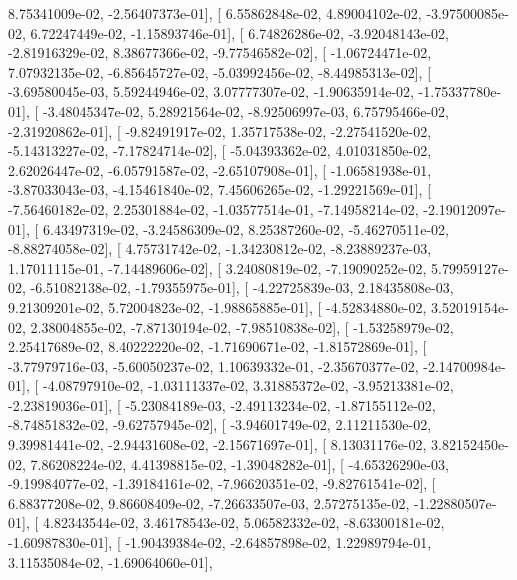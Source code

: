 \documentclass{article}
\begin{document}
          8.75341009e-02,  -2.56407373e-01],
       [  6.55862848e-02,   4.89004102e-02,  -3.97500085e-02,
          6.72247449e-02,  -1.15893746e-01],
       [  6.74826286e-02,  -3.92048143e-02,  -2.81916329e-02,
          8.38677366e-02,  -9.77546582e-02],
       [ -1.06724471e-02,   7.07932135e-02,  -6.85645727e-02,
         -5.03992456e-02,  -8.44985313e-02],
       [ -3.69580045e-03,   5.59244946e-02,   3.07777307e-02,
         -1.90635914e-02,  -1.75337780e-01],
       [ -3.48045347e-02,   5.28921564e-02,  -8.92506997e-03,
          6.75795466e-02,  -2.31920862e-01],
       [ -9.82491917e-02,   1.35717538e-02,  -2.27541520e-02,
         -5.14313227e-02,  -7.17824714e-02],
       [ -5.04393362e-02,   4.01031850e-02,   2.62026447e-02,
         -6.05791587e-02,  -2.65107908e-01],
       [ -1.06581938e-01,  -3.87033043e-03,  -4.15461840e-02,
          7.45606265e-02,  -1.29221569e-01],
       [ -7.56460182e-02,   2.25301884e-02,  -1.03577514e-01,
         -7.14958214e-02,  -2.19012097e-01],
       [  6.43497319e-02,  -3.24586309e-02,   8.25387260e-02,
         -5.46270511e-02,  -8.88274058e-02],
       [  4.75731742e-02,  -1.34230812e-02,  -8.23889237e-03,
          1.17011115e-01,  -7.14489606e-02],
       [  3.24080819e-02,  -7.19090252e-02,   5.79959127e-02,
         -6.51082138e-02,  -1.79355975e-01],
       [ -4.22725839e-03,   2.18435808e-03,   9.21309201e-02,
          5.72004823e-02,  -1.98865885e-01],
       [ -4.52834880e-02,   3.52019154e-02,   2.38004855e-02,
         -7.87130194e-02,  -7.98510838e-02],
       [ -1.53258979e-02,   2.25417689e-02,   8.40222220e-02,
         -1.71690671e-02,  -1.81572869e-01],
       [ -3.77979716e-03,  -5.60050237e-02,   1.10639332e-01,
         -2.35670377e-02,  -2.14700984e-01],
       [ -4.08797910e-02,  -1.03111337e-02,   3.31885372e-02,
         -3.95213381e-02,  -2.23819036e-01],
       [ -5.23084189e-03,  -2.49113234e-02,  -1.87155112e-02,
         -8.74851832e-02,  -9.62757945e-02],
       [ -3.94601749e-02,   2.11211530e-02,   9.39981441e-02,
         -2.94431608e-02,  -2.15671697e-01],
       [  8.13031176e-02,   3.82152450e-02,   7.86208224e-02,
          4.41398815e-02,  -1.39048282e-01],
       [ -4.65326290e-03,  -9.19984077e-02,  -1.39184161e-02,
         -7.96620351e-02,  -9.82761541e-02],
       [  6.88377208e-02,   9.86608409e-02,  -7.26633507e-03,
          2.57275135e-02,  -1.22880507e-01],
       [  4.82343544e-02,   3.46178543e-02,   5.06582332e-02,
         -8.63300181e-02,  -1.60987830e-01],
       [ -1.90439384e-02,  -2.64857898e-02,   1.22989794e-01,
          3.11535084e-02,  -1.69064060e-01],
\end{document}

